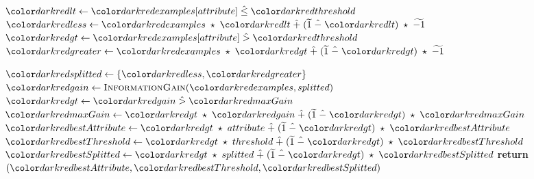 \begin{algorithm}[H]
\begin{algorithmic}[1]
          \State $\red{lt} \gets \red{examples}[attribute] \hlte \red{threshold}$ 
          \State $\red{less} \gets \red{examples} \hmul \red{lt} \hplus (\enc{1} \hminus \red{lt}) \hmul \enc{-1} $ 
          \State $\red{gt} \gets \red{examples}[attribute] \hgt \red{threshold}$
          \State $\red{greater} \gets \red{examples} \hmul \red{gt} \hplus (\enc{1} \hminus \red{gt}) \hmul \enc{-1} $

          \State $\red{splitted} \gets \{\red{less}, \red{greater}\}$
          \State $\red{gain} \gets  \textsc{InformationGain}(\red{examples}, splitted)$
          \State $\red{gt} \gets \red{gain} \hgt  \red{maxGain}$
          \State $\red{maxGain} \gets \red{gt} \hmul \red{gain} \hplus (\enc{1} \hminus \red{gt}) \hmul \red{maxGain}$ 
          \State $\red{bestAttribute} \gets \red{gt} \hmul attribute \hplus (\enc{1} \hminus \red{gt}) \hmul \red{bestAttribute}$
          \State $\red{bestThreshold} \gets \red{gt} \hmul threshold \hplus (\enc{1} \hminus \red{gt}) \hmul \red{bestThreshold}$
          \State $\red{bestSplitted} \gets \red{gt} \hmul splitted \hplus (\enc{1} \hminus \red{gt}) \hmul \red{bestSplitted}$
        \EndFor
    \EndIf
  \EndFor
  \State \textbf{return} $(\red{bestAttribute}, \red{bestThreshold}, \red{bestSplitted})$
\EndProcedure
\end{algorithmic}
\end{algorithm}

